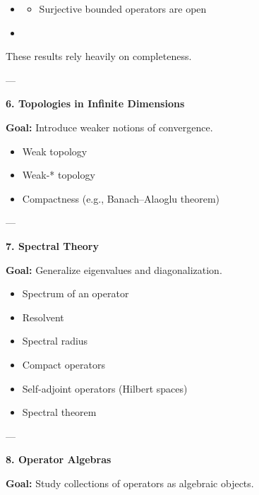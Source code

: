 \documentclass[12pt,a4paper]{report}
\begin{document}
\begin{description}
\begin{itemize}
	\begin{itemize}
        \item Control of operator families
	\end{itemize}
    \item {}

	\begin{itemize}
        \item Surjective bounded operators are open
	\end{itemize}
    \item {}
\end{itemize}

These results rely heavily on completeness.

---

\item \textbf{6. Topologies in Infinite Dimensions}

\item \textbf{Goal:} Introduce weaker notions of convergence.

\begin{itemize}
    \item Weak topology
    \item Weak-* topology
    \item Compactness (e.g., Banach–Alaoglu theorem)
\end{itemize}

---

\item \textbf{7. Spectral Theory}

\item \textbf{Goal:} Generalize eigenvalues and diagonalization.

\begin{itemize}
    \item Spectrum of an operator
    \item Resolvent
    \item Spectral radius
    \item Compact operators
    \item Self-adjoint operators (Hilbert spaces)
    \item Spectral theorem
\end{itemize}

---

\item \textbf{8. Operator Algebras}

\item \textbf{Goal:} Study collections of operators as algebraic objects.


\end{description}
\end{document}
